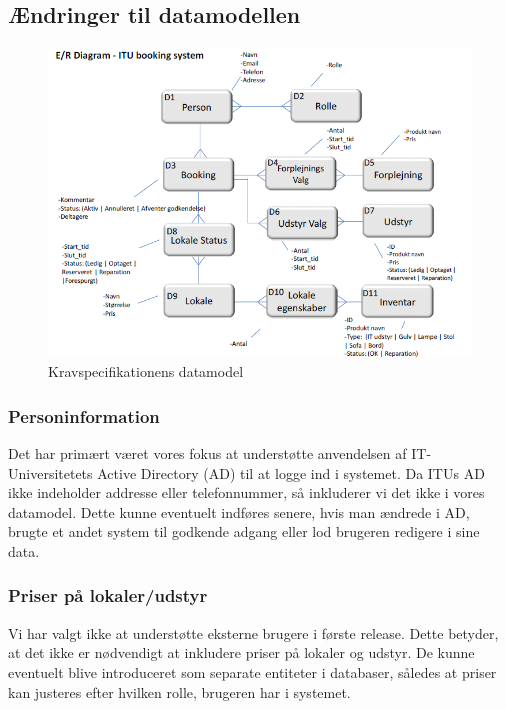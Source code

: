 \subsection{Ændringer til datamodellen}
\label{Technical_Database_changes}
\begin{figure}[h!]
  \centering
    \includegraphics[width=\textwidth]{Chapters/Design/Technical/Images/KSdata}
  \caption{Kravspecifikationens datamodel}
\label{Fig:Technical_Database_changes_KSdata}
\end{figure}

\subsubsection{Personinformation}
\label{Technical_Database_changes_personinfo}
Det har primært været vores fokus at understøtte anvendelsen af IT-Universitetets Active Directory (AD) til at logge ind i systemet. Da ITUs AD ikke indeholder addresse eller telefonnummer, så inkluderer vi det ikke i vores datamodel. Dette kunne eventuelt indføres senere, hvis man ændrede i AD, brugte et andet system til godkende adgang eller lod brugeren redigere i sine data.

\subsubsection{Priser på lokaler/udstyr}
\label{Technical_Database_changes_prices}
Vi har valgt ikke at understøtte eksterne brugere i første release. Dette betyder, at det ikke er nødvendigt at inkludere priser på lokaler og udstyr. De kunne eventuelt blive introduceret som separate entiteter i databaser, således at priser kan justeres efter hvilken rolle, brugeren har i systemet.

